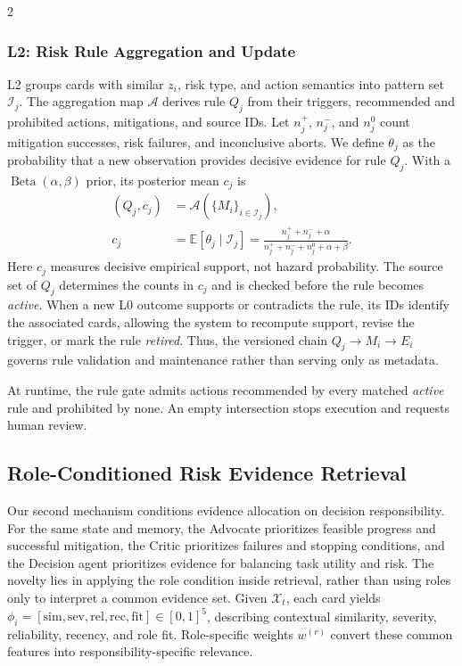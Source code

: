 \documentclass[10pt]{article}
\begin{document}
\begin{multicols}{2}
\subsubsection{L2: Risk Rule Aggregation and Update}

L2 groups cards with similar $z_i$, risk type, and action semantics into pattern set $\mathcal{I}_j$. The aggregation map $\mathcal{A}$ derives rule $Q_j$ from their triggers, recommended and prohibited actions, mitigations, and source IDs. Let $n_j^+$, $n_j^-$, and $n_j^0$ count mitigation successes, risk failures, and inconclusive aborts. We define $\theta_j$ as the probability that a new observation provides decisive evidence for rule $Q_j$. With a $\operatorname{Beta}(\alpha,\beta)$ prior, its posterior mean $c_j$ is
\begin{equation}
\begin{aligned}
(Q_j,c_j)&=\mathcal{A}(\{M_i\}_{i\in\mathcal{I}_j}),\\
c_j&=\mathbb{E}[\theta_j\mid\mathcal{I}_j]
=\frac{n_j^++n_j^-+\alpha}
{n_j^++n_j^-+n_j^0+\alpha+\beta}.
\end{aligned}
\label{eq:rule-en}
\end{equation}
Here $c_j$ measures decisive empirical support, not hazard probability. The source set of $Q_j$ determines the counts in $c_j$ and is checked before the rule becomes \textit{active}. When a new L0 outcome supports or contradicts the rule, its IDs identify the associated cards, allowing the system to recompute support, revise the trigger, or mark the rule \textit{retired}. Thus, the versioned chain $Q_j\rightarrow M_i\rightarrow E_i$ governs rule validation and maintenance rather than serving only as metadata.

At runtime, the rule gate admits actions recommended by every matched \textit{active} rule and prohibited by none. An empty intersection stops execution and requests human review.

\subsection{Role-Conditioned Risk Evidence Retrieval}

Our second mechanism conditions evidence allocation on decision responsibility. For the same state and memory, the Advocate prioritizes feasible progress and successful mitigation, the Critic prioritizes failures and stopping conditions, and the Decision agent prioritizes evidence for balancing task utility and risk. The novelty lies in applying the role condition inside retrieval, rather than using roles only to interpret a common evidence set. Given $\mathcal{X}_t$, each card yields $\phi_i=[\mathrm{sim},\mathrm{sev},\mathrm{rel},\mathrm{rec},\mathrm{fit}]\in[0,1]^5$, describing contextual similarity, severity, reliability, recency, and role fit. Role-specific weights $w^{(r)}$ convert these common features into responsibility-specific relevance.


\end{multicols}
\end{document}
